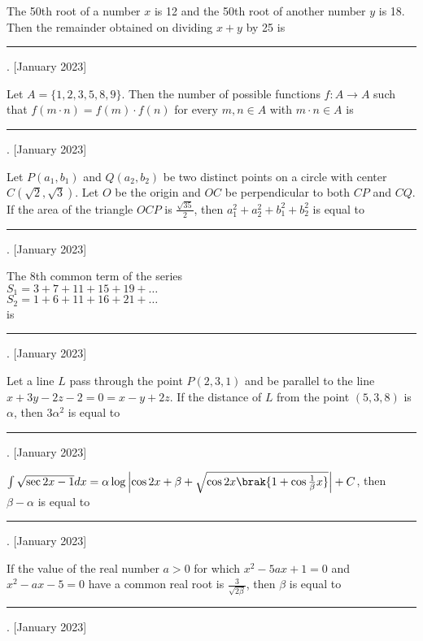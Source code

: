\iffalse
\title{2023}
\author{AI24BTECH11012}
\section{integer}
\fi
    \item The 50th root of a number $x$ is 12 and the 50th root of another number $y$ is 18. Then the remainder obtained on dividing $x + y$ by 25 is \rule{2.5cm}{0.4pt}.
    \hfill{[January 2023]}
    
    \item Let $A = \{1, 2, 3, 5, 8, 9\}$. Then the number of possible functions $f: A \to A$ such that $f(m \cdot n) = f(m) \cdot f(n)$ for every $m, n \in A$ with $m \cdot n \in A$ is \rule{2.5cm}{0.4pt}.
    \hfill{[January 2023]}
    
    \item Let $P(a_1, b_1)$ and $Q(a_2, b_2)$ be two distinct points on a circle with center $C(\sqrt{2}, \sqrt{3})$. Let $O$ be the origin and $OC$ be perpendicular to both $CP$ and $CQ$. If the area of the triangle $OCP$ is $\frac{\sqrt{35}}{2}$, then $a_1^2 + a_2^2 + b_1^2 + b_2^2$ is equal to \rule{2.5cm}{0.4pt}.
    \hfill{[January 2023]}
    
    \item The 8th common term of the series\\$S_1 = 3 + 7 + 11 + 15 + 19 + \dots$\\$S_2 = 1 + 6 + 11 + 16 + 21 + \dots$\\is \rule{2.5cm}{0.4pt}.
    \hfill{[January 2023]}
    
    \item Let a line $L$ pass through the point $P(2, 3, 1)$ and be parallel to the line $x + 3y - 2z - 2 = 0 = x - y + 2z$. If the distance of $L$ from the point $(5, 3, 8)$ is $\alpha$, then $3\alpha^2$ is equal to \rule{2.5cm}{0.4pt}.
    \hfill{[January 2023]}
    
    \item $\int \sqrt{\sec{2x} - 1} dx = \alpha\log \left| \cos{2x}+\beta+\sqrt{\cos{2x}\brak{1+\cos{\frac{1}{\beta}x}}} \right| + C$, then $\beta - \alpha$ is equal to \rule{2.5cm}{0.4pt}.
    \hfill{[January 2023]}
    
    \item If the value of the real number $a > 0$ for which $x^2 - 5ax + 1 = 0$ and $x^2 - ax - 5 = 0$ have a common real root is $\frac{3}{\sqrt{2\beta}}$, then $\beta$ is equal to \rule{2.5cm}{0.4pt}.
    \hfill{[January 2023]}
    
